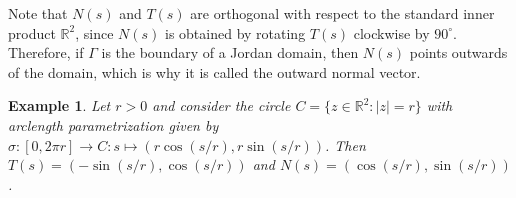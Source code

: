 \documentclass[10pt]{article}
\newcommand{\R}{\mathbb{R}}
\theoremstyle{newstyle}
\newtheorem{exmp}[thm]{Example}
\begin{document}
Note that $N(s)$ and $T(s)$ are orthogonal with respect to the standard inner product $\R^2$, since 
$N(s)$ is obtained by rotating $T(s)$ clockwise by $90^\circ$. Therefore, if $\Gamma$ is 
the boundary of a Jordan domain, then $N(s)$ points outwards of the domain, which is why it is called the
outward normal vector.

\begin{exmp}
Let $r > 0$ and consider the circle $C = \{z \in \R^2 : |z| = r\}$ with arclength parametrization 
given by $\sigma : [0, 2\pi r] \to C : s \mapsto (r \cos(s/r), r\sin(s/r))$. Then 
$T(s) = (-\sin(s/r), \cos(s/r))$ and $N(s) = (\cos(s/r), \sin(s/r))$. 

\begin{center}

\begin{tikzpicture}[x=0.75pt,y=0.75pt,yscale=-1,xscale=1]


\end{tikzpicture}
\end{center}
\end{exmp}
\end{document}
